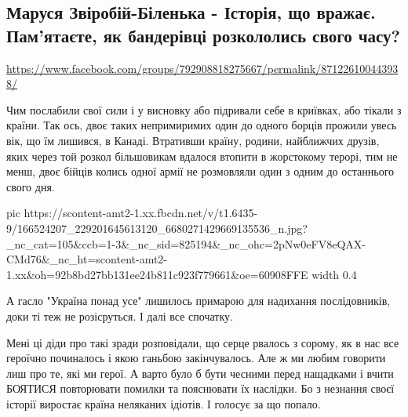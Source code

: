  
 
 
 
 

\subsection{Маруся Звіробій-Біленька - Історія, що вражає. Пам'ятаєте, як бандерівці розкололись свого часу? }
\label{sec:29_03_2021.fb.borysenko_daria.1.marusja_zvirobij}
\url{https://www.facebook.com/groups/792908818275667/permalink/871226100443938/}

Чим послабили свої сили і у висновку або підривали себе в криївках, або тікали
з країни. Так ось, двоє таких непримиримих один до одного борців прожили увесь
вік, що їм лишився, в Канаді. Втративши країну, родини, найближчих друзів, яких
через той розкол більшовикам вдалося втопити в жорстокому терорі, тим не менш,
двоє бійців колись одної армії не розмовляли один з одним до останнього свого
дня. 


\ifcmt
  pic https://scontent-amt2-1.xx.fbcdn.net/v/t1.6435-9/166524207_229201645613120_6680271429669135536_n.jpg?_nc_cat=105&ccb=1-3&_nc_sid=825194&_nc_ohc=2pNw0eFV8eQAX-CMd76&_nc_ht=scontent-amt2-1.xx&oh=92b8bd27bb131ee24b811c923f779661&oe=60908FFE
  width 0.4
\fi


А гасло "Україна понад усе" лишилось примарою для надихання послідовників, доки
ті теж не розісруться. І далі все спочатку. 

Мені ці діди про такі зради розповідали, що серце рвалось з сорому, як в нас
все героїчно починалось і якою ганьбою закінчувалось. Але ж ми любим говорити
лиш про те, які ми герої. А варто було б бути чесними перед нащадками і вчити
БОЯТИСЯ повторювати помилки та пояснювати їх наслідки. Бо з незнання своєї
історії виростає країна неляканих ідіотів. І голосує за що попало.
